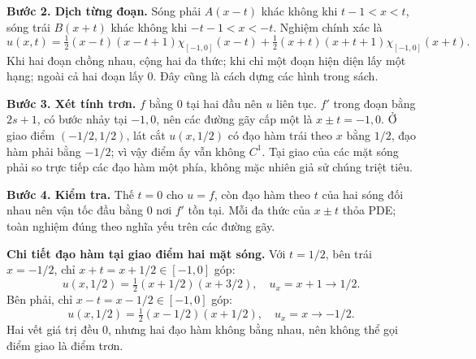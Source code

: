 \documentclass[10pt,a4paper]{article}
\begin{document}
\textbf{Bước 2. Dịch từng đoạn.} Sóng phải $A(x-t)$ khác không khi $t-1<x<t$, sóng trái $B(x+t)$ khác không khi $-t-1<x<-t$. Nghiệm chính xác là
\[u(x,t)=\tfrac12(x-t)(x-t+1)\chi_{[-1,0]}(x-t)+\tfrac12(x+t)(x+t+1)\chi_{[-1,0]}(x+t).\]
Khi hai đoạn chồng nhau, cộng hai đa thức; khi chỉ một đoạn hiện diện lấy một hạng; ngoài cả hai đoạn lấy $0$. Đây cũng là cách dựng các hình trong sách.

\textbf{Bước 3. Xét tính trơn.} $f$ bằng $0$ tại hai đầu nên $u$ liên tục. $f'$ trong đoạn bằng $2s+1$, có bước nhảy tại $-1,0$, nên các đường gãy cấp một là $x\pm t=-1,0$. Ở giao điểm $(-1/2,1/2)$, lát cắt $u(x,1/2)$ có đạo hàm trái theo $x$ bằng $1/2$, đạo hàm phải bằng $-1/2$; vì vậy điểm ấy vẫn không $C^1$. Tại giao của các mặt sóng phải so trực tiếp các đạo hàm một phía, không mặc nhiên giả sử chúng triệt tiêu.

\textbf{Bước 4. Kiểm tra.} Thế $t=0$ cho $u=f$, còn đạo hàm theo $t$ của hai sóng đối nhau nên vận tốc đầu bằng $0$ nơi $f'$ tồn tại. Mỗi đa thức của $x\pm t$ thỏa PDE; toàn nghiệm đúng theo nghĩa yếu trên các đường gãy.

\textbf{Chi tiết đạo hàm tại giao điểm hai mặt sóng.} Với $t=1/2$, bên trái $x=-1/2$, chỉ $x+t=x+1/2\in[-1,0]$ góp:
\[u(x,1/2)=\tfrac12(x+1/2)(x+3/2),\quad u_x=x+1\to1/2.\]
Bên phải, chỉ $x-t=x-1/2\in[-1,0]$ góp:
\[u(x,1/2)=\tfrac12(x-1/2)(x+1/2),\quad u_x=x\to-1/2.\]
Hai vết giá trị đều $0$, nhưng hai đạo hàm không bằng nhau, nên không thể gọi điểm giao là điểm trơn.
\end{document}
